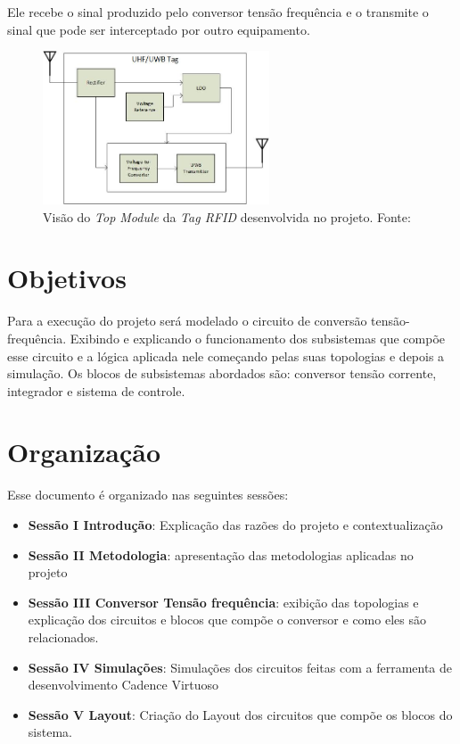 Ele recebe o sinal produzido pelo conversor tensão frequência e o transmite o sinal que pode ser interceptado por outro equipamento.

\begin{figure}[htb]
	\centering
	\includegraphics[width=0.6\textwidth]{figuras/Top.jpg}
	\caption{Visão do \textit{Top Module} da \textit{Tag RFID} desenvolvida no projeto. Fonte:\cite{artigo_tag_unb} }
	\label{fig02}
\end{figure}

\section{Objetivos}

 Para a execução do projeto será modelado o circuito de conversão tensão-frequência. Exibindo e explicando o funcionamento dos subsistemas que compõe esse circuito e a lógica aplicada nele começando pelas suas topologias e depois a simulação. Os blocos de subsistemas abordados são: conversor tensão corrente, integrador e sistema de controle.

\section{Organização}

Esse documento é organizado nas seguintes sessões:
\begin{itemize}
	\item \textbf{Sessão I Introdução}: Explicação das razões do projeto e contextualização
	\item \textbf{Sessão II Metodologia}: apresentação das metodologias aplicadas no projeto
	\item \textbf{Sessão III Conversor Tensão frequência}: exibição das topologias e explicação dos circuitos e blocos que compõe o conversor e como eles são relacionados.
	\item \textbf{Sessão IV Simulações}: Simulações dos circuitos feitas com a ferramenta de desenvolvimento Cadence Virtuoso
	\item \textbf{Sessão V Layout}: Criação do Layout dos circuitos que compõe os blocos do sistema.
\end{itemize}




